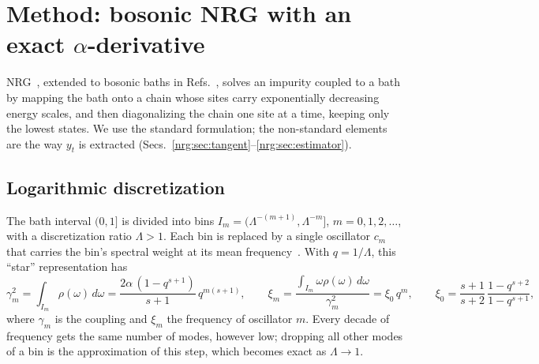 \section{Method: bosonic NRG with an exact \texorpdfstring{$\alpha$}{alpha}-derivative}\label{nrg:sec:method}
NRG~\cite{nrg:Wilson1975,nrg:Bulla2008}, extended to bosonic baths in Refs.~\cite{nrg:Bulla2003,nrg:Bulla2005}, solves an impurity coupled to a bath
by mapping the bath onto a chain whose sites carry exponentially decreasing energy scales, and then diagonalizing the chain one site
at a time, keeping only the lowest states. We use the standard formulation; the non-standard elements are the way $y_t$ is extracted
(Secs.~\ref{nrg:sec:tangent}--\ref{nrg:sec:estimator}).

\subsection{Logarithmic discretization}
The bath interval $(0,1]$ is divided into bins $I_m=(\Lambda^{-(m+1)},\Lambda^{-m}]$, $m=0,1,2,\dots$, with a discretization ratio
$\Lambda>1$. Each bin is replaced by a single oscillator $c_m$ that carries the bin's spectral weight at its mean
frequency~\cite{nrg:Bulla2003,nrg:Bulla2005}. With $q=1/\Lambda$, this ``star'' representation has
\begin{equation}
\gamma_m^2=\int_{I_m}\!\rho(\omega)\,d\omega=\frac{2\alpha\,(1-q^{s+1})}{s+1}\,q^{m(s+1)},\qquad
\xi_m=\frac{\int_{I_m}\omega\rho(\omega)\,d\omega}{\gamma_m^2}=\xi_0\,q^m,\qquad \xi_0=\frac{s+1}{s+2}\,\frac{1-q^{s+2}}{1-q^{s+1}},
\label{nrg:eq:star}
\end{equation}
where $\gamma_m$ is the coupling and $\xi_m$ the frequency of oscillator $m$. Every decade of frequency gets the same number of modes,
however low; dropping all other modes of a bin is the approximation of this step, which becomes exact as $\Lambda\to1$.

